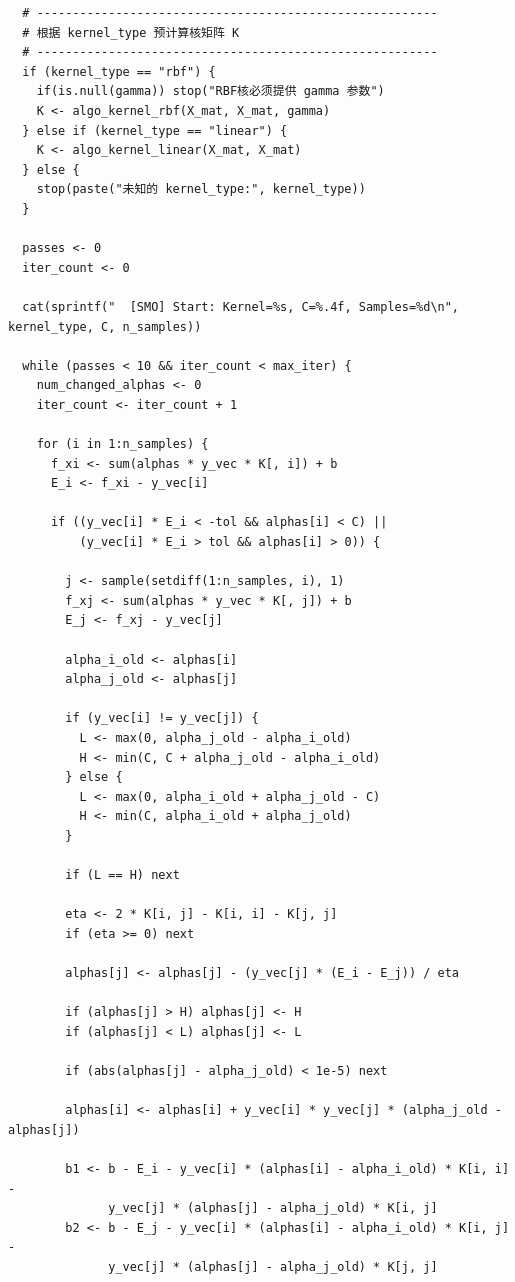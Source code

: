 \documentclass[11pt, a4paper]{article}
\begin{document}
\begin{verbatim}
  # --------------------------------------------------------
  # 根据 kernel_type 预计算核矩阵 K
  # --------------------------------------------------------
  if (kernel_type == "rbf") {
    if(is.null(gamma)) stop("RBF核必须提供 gamma 参数")
    K <- algo_kernel_rbf(X_mat, X_mat, gamma)
  } else if (kernel_type == "linear") {
    K <- algo_kernel_linear(X_mat, X_mat)
  } else {
    stop(paste("未知的 kernel_type:", kernel_type))
  }
  
  passes <- 0 
  iter_count <- 0
  
  cat(sprintf("  [SMO] Start: Kernel=%s, C=%.4f, Samples=%d\n", kernel_type, C, n_samples))
  
  while (passes < 10 && iter_count < max_iter) {
    num_changed_alphas <- 0
    iter_count <- iter_count + 1
    
    for (i in 1:n_samples) {
      f_xi <- sum(alphas * y_vec * K[, i]) + b
      E_i <- f_xi - y_vec[i]
      
      if ((y_vec[i] * E_i < -tol && alphas[i] < C) || 
          (y_vec[i] * E_i > tol && alphas[i] > 0)) {
        
        j <- sample(setdiff(1:n_samples, i), 1)
        f_xj <- sum(alphas * y_vec * K[, j]) + b
        E_j <- f_xj - y_vec[j]
        
        alpha_i_old <- alphas[i]
        alpha_j_old <- alphas[j]
        
        if (y_vec[i] != y_vec[j]) {
          L <- max(0, alpha_j_old - alpha_i_old)
          H <- min(C, C + alpha_j_old - alpha_i_old)
        } else {
          L <- max(0, alpha_i_old + alpha_j_old - C)
          H <- min(C, alpha_i_old + alpha_j_old)
        }
        
        if (L == H) next
        
        eta <- 2 * K[i, j] - K[i, i] - K[j, j]
        if (eta >= 0) next
        
        alphas[j] <- alphas[j] - (y_vec[j] * (E_i - E_j)) / eta
        
        if (alphas[j] > H) alphas[j] <- H
        if (alphas[j] < L) alphas[j] <- L
        
        if (abs(alphas[j] - alpha_j_old) < 1e-5) next
        
        alphas[i] <- alphas[i] + y_vec[i] * y_vec[j] * (alpha_j_old - alphas[j])
        
        b1 <- b - E_i - y_vec[i] * (alphas[i] - alpha_i_old) * K[i, i] - 
              y_vec[j] * (alphas[j] - alpha_j_old) * K[i, j]
        b2 <- b - E_j - y_vec[i] * (alphas[i] - alpha_i_old) * K[i, j] - 
              y_vec[j] * (alphas[j] - alpha_j_old) * K[j, j]
        

\end{verbatim}
\end{document}
